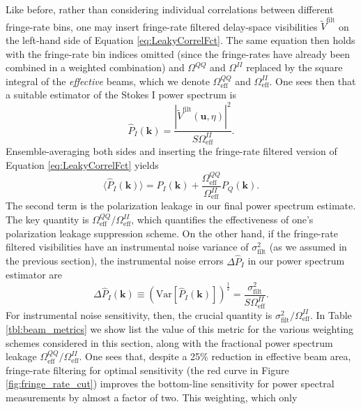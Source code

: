 \documentclass[twocolumn,apj,numberedappendix]{emulateapj}
\begin{document}
Like before, rather than considering individual correlations between different fringe-rate bins, one may
insert fringe-rate filtered delay-space visibilities $\widetilde{V}^\textrm{filt} $ on the left-hand side of Equation \eqref{eq:LeakyCorrelFct}. The
same equation then holds with the fringe-rate bin indices omitted (since the fringe-rates have already
been combined in a weighted combination) and $\Omega^{QQ}$ and $\Omega^{II}$ replaced
by the square integral of the \emph{effective} beams, which we denote $\Omega^{QQ}_\textrm{eff}$ and $\Omega^{II}_\textrm{eff}$. One sees then that a suitable estimator of
the Stokes I power spectrum is
\begin{equation}
\widehat{P}_I (\mathbf{k}) =\frac{ | \widetilde{V}^\textrm{filt} (\mathbf{u}, \eta) |^2}{S \Omega^{II}_\textrm{eff}}.
\end{equation}
Ensemble-averaging both sides and inserting the fringe-rate filtered version of Equation \eqref{eq:LeakyCorrelFct} yields
\begin{equation}
\langle \widehat{P}_I (\mathbf{k}) \rangle = P_I (\mathbf{k}) + \frac{\Omega^{QQ}_\textrm{eff}}{\Omega^{II}_\textrm{eff}} P_Q (\mathbf{k}).
\end{equation}
The second term is the polarization leakage in our final power spectrum estimate. The key quantity is $\Omega^{QQ}_\textrm{eff}/\Omega^{II}_\textrm{eff}$, which quantifies the effectiveness of
one's polarization leakage suppression scheme. On the other hand, if the fringe-rate filtered
visibilities have an instrumental noise variance of $\sigma^2_\textrm{filt}$ (as we assumed in the previous section),
the instrumental noise errors $\Delta \widehat{P}_I$ in our power spectrum estimator are
\begin{equation}
\Delta \widehat{P}_I (\mathbf{k}) \equiv \left(\textrm{Var} \left[\widehat{P}_I (\mathbf{k}) \right]\right)^\frac{1}{2} = \frac{\sigma^2_\textrm{filt}}{S\Omega^{II}_\textrm{eff}}.
\end{equation}
For instrumental noise sensitivity, then, the crucial quantity is $\sigma^2_\textrm{filt} / \Omega^{II}_\textrm{eff}$. In Table \ref{tbl:beam_metrics} we show list the value of this metric for the various
weighting schemes considered in this section, along with the fractional power spectrum
leakage $\Omega^{QQ}_\textrm{eff}/\Omega^{II}_\textrm{eff}$. One sees that, despite a 25\% reduction
in effective beam area, fringe-rate filtering for optimal sensitivity (the red curve in
Figure \ref{fig:fringe_rate_cut}) improves the bottom-line
sensitivity for power spectral measurements by almost a factor of two.  This weighting, which only
\end{document}
